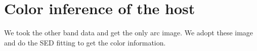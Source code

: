 \documentclass[fleqn,usenatbib]{mnras}
\begin{document}


\appendix

\section{Color inference of the host}
We took the other band data and get the only arc image. We adopt these image and do the SED fitting to get the color information.



\bsp	%
\label{lastpage}
\end{document}
